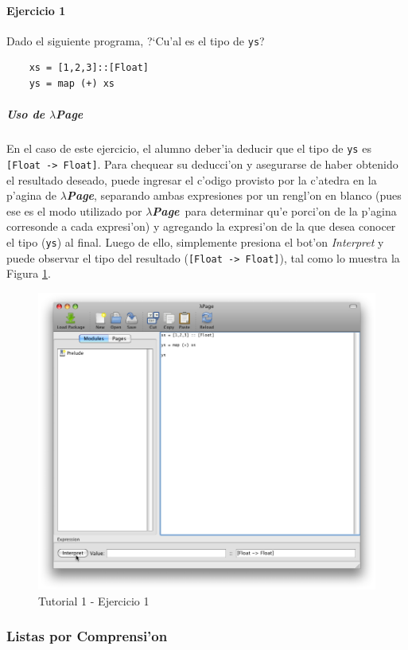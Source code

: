 \documentclass[a4paper]{article}
\newcommand{\hpage}{\textbf{\textsl{$\lambda$Page}}}
\begin{document}
\paragraph{Ejercicio 1}Dado el siguiente programa, ?`Cu'al es el tipo de \texttt{ys}?
\lstset{language=haskell, frame=single, tabsize=4}
\begin{center}\begin{lstlisting}
	xs = [1,2,3]::[Float]
	ys = map (+) xs
\end{lstlisting}\end{center}
\subparagraph{Uso de \hpage}En el caso de este ejercicio, el alumno deber'ia deducir que el tipo de \texttt{ys} es \texttt{[Float -> Float]}.  Para chequear su deducci'on y asegurarse de haber obtenido el resultado deseado, puede ingresar el c'odigo provisto por la c'atedra en la p'agina de \hpage, separando ambas expresiones por un rengl'on en blanco (pues ese es el modo utilizado por \hpage\ para determinar qu'e porci'on de la p'agina corresonde a cada expresi'on) y agregando la expresi'on de la que desea conocer el tipo (\texttt{ys}) al final.  Luego de ello, simplemente presiona el bot'on \textsl{Interpret} y puede observar el tipo del resultado (\texttt{[Float -> Float]}), tal como lo muestra la Figura \ref{tut101}.
\begin{figure}[hp]
	\begin{center}
        	\includegraphics[width=.75\textwidth]{pictures/tut1/01}
		\caption{Tutorial 1 - Ejercicio 1}
		\label{tut101}
	\end{center}
\end{figure}

\newpage
\subsubsection{Listas por Comprensi'on}
\end{document}
